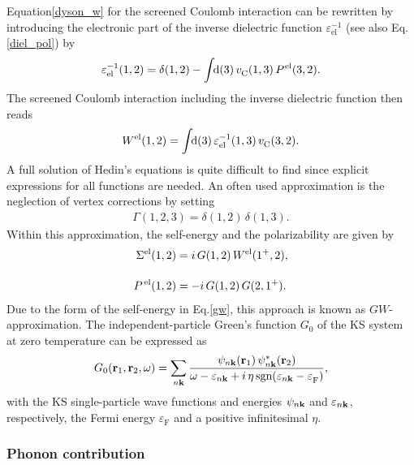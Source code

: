 Equation\;\eqref{dyson_w} for the screened Coulomb interaction can be rewritten by introducing the electronic part of the inverse dielectric function $ \varepsilon_\text{el}^{-1}$ (see also  Eq.\;\eqref{diel_pol}) by
 \begin{equation}\label{epsel_pol}
         \varepsilon_\text{el}^{-1}(1,2) = \delta(1,2) - \int\text{\!\!d}(3)\,v_\text{C}^{\phantom{I}}(1,3)\, P^{\hspace{.2mm}\text{el}}(3,2).
 \end{equation}
 The screened Coulomb interaction including the inverse dielectric function then reads
%
\begin{equation}\label{w_epsinv}
    W^\text{el}(1,2) = \int\text{\!\!d}(3)\,\varepsilon_\text{el}^{-1}(1,3)\,v_\text{C}^{\phantom{I}}(3,2).
\end{equation}
%
 A full solution of Hedin's equations is quite difficult to find since explicit expressions for all functions are needed.
 \newpage
 An often used approximation is the neglection of vertex corrections by setting 
\begin{align}
\Gamma(1,2,3)=\delta(1,2)\,\delta(1,3).    
\end{align}
Within this approximation, the self-energy and the polarizability are given by
 \begin{align}
     \Sigma^\text{el}(1,2) & = i\,G(1,2)\,W^\text{el}(1^+,2),\label{gw}\\[10pt]
      P^{\hspace{.5mm}\text{el}}(1,2) & = -i\,G(1,2)\,G(2,1^+).
 \end{align}
%
Due to the form of the self-energy in Eq.\;\eqref{gw}, this approach is known as \ldq$GW$-approximation\rdq. The independent-particle Green's function $G_0$ of the KS system at zero temperature can be expressed as 
%
\begin{equation}\label{green_single}
    G_0(\mathbf{r}_1,\mathbf{r}_2,\omega) = \sum_{n\mathbf{k}}\frac{\psi_{n\mathbf{k}}(\mathbf{r}_1)\,\psi^*_{n\mathbf{k}}(\mathbf{r}_2)}{\omega - \varepsilon_{n\mathbf{k}} + i\,\eta\,\text{sgn}(\varepsilon_{n\mathbf{k}} - \varepsilon^{\phantom{I}}_\text{F})},
\end{equation}
%
with the KS single-particle wave functions and energies $\psi_{n\mathbf{k}}$ and $\varepsilon_{n\mathbf{k}}$, respectively, the Fermi energy $\varepsilon^{\phantom{I}}_\text{F}$  and a positive infinitesimal $\eta$.


\subsubsection{Phonon contribution}\label{epi_el}

